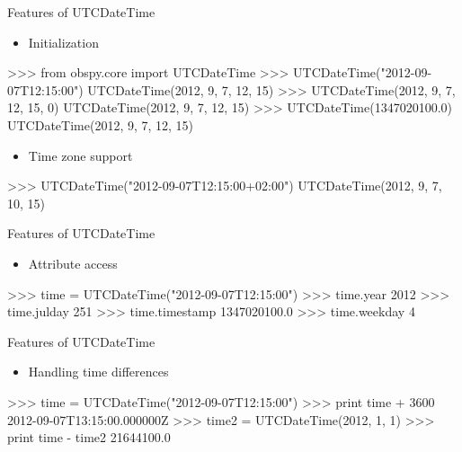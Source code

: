 \begin{frame}{Features of UTCDateTime}
    \begin{itemize}
        \item Initialization
    \end{itemize}
\begin{myColorBox}{0.95}{}
\begin{python}
>>> from obspy.core import UTCDateTime
>>> UTCDateTime("2012-09-07T12:15:00")
UTCDateTime(2012, 9, 7, 12, 15)
>>> UTCDateTime(2012, 9, 7, 12, 15, 0)
UTCDateTime(2012, 9, 7, 12, 15)
>>> UTCDateTime(1347020100.0)
UTCDateTime(2012, 9, 7, 12, 15)
\end{python}
\end{myColorBox}


\begin{itemize}
    \item Time zone support
\end{itemize}

\begin{myColorBox}{0.95}{}
\begin{python}
>>> UTCDateTime("2012-09-07T12:15:00+02:00")
UTCDateTime(2012, 9, 7, 10, 15)
\end{python}
\end{myColorBox}


\end{frame}


\begin{frame}{Features of UTCDateTime}
    \begin{itemize}
        \item Attribute access
    \end{itemize}
\begin{myColorBox}{0.95}{}
\begin{python}
>>> time = UTCDateTime("2012-09-07T12:15:00")
>>> time.year
2012
>>> time.julday
251
>>> time.timestamp
1347020100.0
>>> time.weekday
4
\end{python}
\end{myColorBox}



\end{frame}



\begin{frame}{Features of UTCDateTime}
    \begin{itemize}
        \item Handling time differences
    \end{itemize}

\begin{myColorBox}{0.95}{}
\begin{python}
>>> time = UTCDateTime("2012-09-07T12:15:00")
>>> print time + 3600
2012-09-07T13:15:00.000000Z
>>> time2 = UTCDateTime(2012, 1, 1)
>>> print time - time2
21644100.0
\end{python}
\end{myColorBox}

\end{frame}


